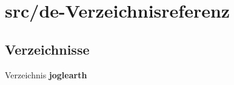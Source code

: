 \section{src/de-\/\-Verzeichnisreferenz}
\label{dir_19551e9aa190a3fb9444c39a13dc30d1}
\subsection*{Verzeichnisse}
\begin{DoxyCompactItemize}
\item 
Verzeichnis {\bf joglearth}
\end{DoxyCompactItemize}
